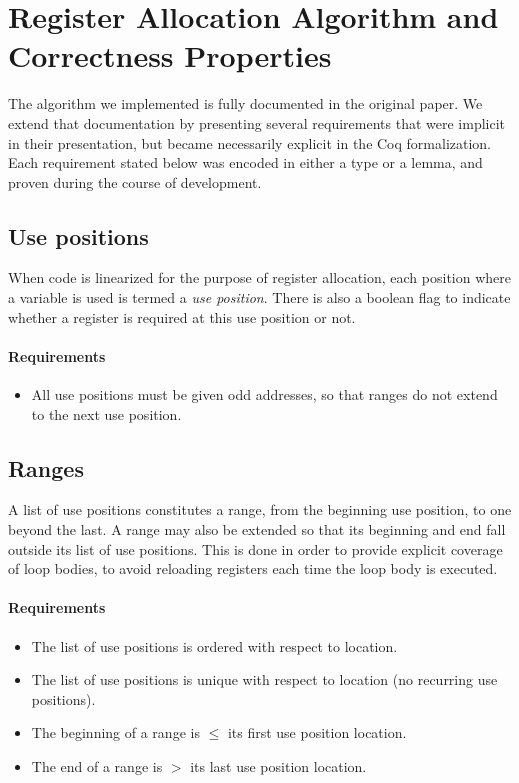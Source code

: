 \documentclass{llncs}
\begin{document}
\section{Register Allocation Algorithm and Correctness Properties}
\label{sec:alg}

The algorithm we implemented is fully documented in the original
paper\cite{Wimmer:2005}.  We extend that documentation by presenting several
requirements that were implicit in their presentation, but became necessarily
explicit in the Coq formalization.  Each requirement stated below was encoded
in either a type or a lemma, and proven during the course of development.

\subsection{Use positions}
\label{sec:usepos}

When code is linearized for the purpose of register allocation, each position
where a variable is used is termed a \emph{use position}.  There is also a
boolean flag to indicate whether a register is required at this use position
or not.

\paragraph{Requirements}

\begin{itemize}
\item All use positions must be given odd addresses, so that ranges do not
  extend to the next use position.
\end{itemize}

\subsection{Ranges}
\label{sec:ranges}

A list of use positions constitutes a range, from the beginning use position,
to one beyond the last.  A range may also be extended so that its beginning
and end fall outside its list of use positions.  This is done in order to
provide explicit coverage of loop bodies, to avoid reloading registers each
time the loop body is executed.

\paragraph{Requirements}

\begin{itemize}
\item The list of use positions is ordered with respect to location.
\item The list of use positions is unique with respect to location (no
  recurring use positions).
\item The beginning of a range is $\le$ its first use position location.
\item The end of a range is $>$ its last use position location.
\end{itemize}
\end{document}
